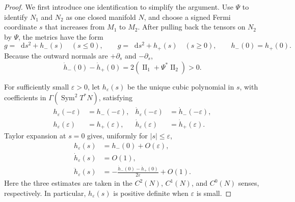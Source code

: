 \documentclass[11pt,reqno]{amsart}
\theoremstyle{definition}
\numberwithin{equation}{section}
\DeclareMathOperator{\II}{II}
\DeclareMathOperator{\Sym}{Sym}
\newcommand{\dd}{\mathop{}\!\mathrm d}
\begin{document}
\begin{proof}
We first introduce one identification to simplify the argument.  Use $\Psi$ to identify
$N_1$ and $N_2$ as one closed manifold $N$, and choose a signed Fermi
coordinate $s$ that increases from $M_1$ to $M_2$.  After pulling back
the tensors on $N_2$ by $\Psi$, the metrics have the form
\[
 g=\dd s^2+h_-(s)\quad(s\le0),\qquad
 g=\dd s^2+h_+(s)\quad(s\ge0),\qquad h_-(0)=h_+(0).
\]
Because the outward normals are $+\partial_s$ and $-\partial_s$,
\begin{equation}
 \dot h_-(0)-\dot h_+(0)
   =2(\II_1+\Psi^*\II_2)>0.                    \label{eq:normal-derivative-gap}
\end{equation}

For sufficiently small $\varepsilon>0$, let $h_\varepsilon(s)$ be the
unique cubic polynomial in $s$, with coefficients in
$\Gamma(\Sym^2T^*N)$, satisfying
\[
 \begin{aligned}
 h_\varepsilon(-\varepsilon)&=h_-(-\varepsilon),&
 \dot h_\varepsilon(-\varepsilon)&=\dot h_-(-\varepsilon),\\
 h_\varepsilon(\varepsilon)&=h_+(\varepsilon),&
 \dot h_\varepsilon(\varepsilon)&=\dot h_+(\varepsilon).
 \end{aligned}
\]
Taylor expansion at $s=0$ gives, uniformly for
$|s|\le\varepsilon$,
\begin{equation}
 \begin{aligned}
 h_\varepsilon(s)&=h_-(0)+O(\varepsilon),\\
 \dot h_\varepsilon(s)&=O(1),\\
 \ddot h_\varepsilon(s)
   &=-\frac{\dot h_-(0)-\dot h_+(0)}{2\varepsilon}+O(1).
 \end{aligned}                                      \label{eq:hermite-estimates}
\end{equation}
 Here the three estimates are taken in the $C^2(N)$, $C^1(N)$, and $C^0(N)$ senses,
respectively.  In particular, $h_\varepsilon(s)$ is positive definite
when $\varepsilon$ is small.


\end{proof}
\end{document}
